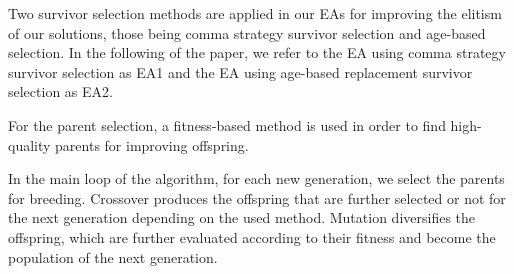 Two survivor selection methods are applied in our EAs for improving the elitism of our solutions, those being comma strategy survivor selection and age-based selection. In the following of the paper, we refer to the EA using comma strategy survivor selection as EA1 and the EA using age-based replacement survivor selection as EA2.

For the parent selection, a fitness-based method is used in order to find high-quality parents for improving offspring. 

In the main loop of the algorithm, for each new generation, we select the parents for breeding. Crossover produces the offspring that are further selected or not for the next generation depending on the used method. Mutation diversifies the offspring, which are further evaluated according to their fitness and become the population of the next generation. 






















